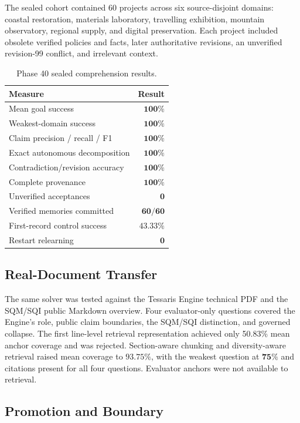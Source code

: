 The sealed cohort contained 60 projects across six source-disjoint domains:
coastal restoration, materials laboratory, travelling exhibition, mountain
observatory, regional supply, and digital preservation.  Each project included
obsolete verified policies and facts, later authoritative revisions, an
unverified revision-99 conflict, and irrelevant context.

\begin{table}[htbp]
\centering
\caption{Phase 40 sealed comprehension results.}
\label{tab:phase40-results}
\begin{tabular}{lr}
\hline
Measure & Result \\
\hline
Mean goal success & \(\mathbf{100\%}\) \\
Weakest-domain success & \(\mathbf{100\%}\) \\
Claim precision / recall / F1 & \(\mathbf{100\%}\) \\
Exact autonomous decomposition & \(\mathbf{100\%}\) \\
Contradiction/revision accuracy & \(\mathbf{100\%}\) \\
Complete provenance & \(\mathbf{100\%}\) \\
Unverified acceptances & \(\mathbf{0}\) \\
Verified memories committed & \(\mathbf{60/60}\) \\
First-record control success & \(43.33\%\) \\
Restart relearning & \(\mathbf{0}\) \\
\hline
\end{tabular}
\end{table}

\subsection{Real-Document Transfer}

The same solver was tested against the Tessaris Engine technical PDF and the
SQM/SQI public Markdown overview.  Four evaluator-only questions covered the
Engine's role, public claim boundaries, the SQM/SQI distinction, and governed
collapse.  The first line-level retrieval representation achieved only
50.83\% mean anchor coverage and was rejected.  Section-aware chunking and
diversity-aware retrieval raised mean coverage to \(\mathbf{93.75\%}\), with
the weakest question at \(\mathbf{75\%}\) and citations present for all four
questions.  Evaluator anchors were not available to retrieval.

\subsection{Promotion and Boundary}

